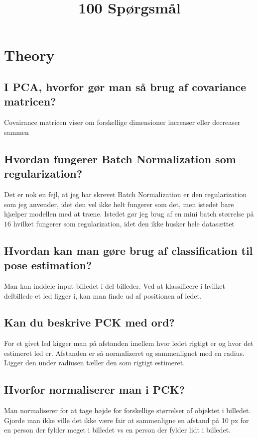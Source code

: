 \documentclass[a4paper]{article}
\begin{document}
\title{100 Spørgsmål}
\author{}
\date{}

\maketitle

\section{Theory}
\subsection{I PCA, hvorfor gør man så brug af covariance matricen?}
Covairance matricen viser om forskellige dimensioner increaser eller decreaser sammen

\subsection{Hvordan fungerer Batch Normalization som regularization?}
Det er nok en fejl, at jeg har skrevet Batch Normalization er den regularization som jeg anvender, idet den vel ikke helt fungerer som det, men istedet bare hjælper modellen med at træne. Istedet gør jeg brug af en mini batch størrelse på $16$ hvilket fungerer som regularization, idet den ikke husker hele datasættet

\subsection{Hvordan kan man gøre brug af classification til pose estimation?}
Man kan inddele input billedet i del billeder. Ved at klassificere i hvilket delbillede et led ligger i, kan man finde ud af positionen af ledet.

\subsection{Kan du beskrive PCK med ord?}
For et givet led kigger man på afstanden imellem hvor ledet rigtigt er og hvor det estimeret led er. Afstanden er så normalizeret og sammenlignet med en radius. Ligger den under radiusen tæller den som rigtigt estimeret.

\subsection{Hvorfor normaliserer man i PCK?}
Man normaliserer for at tage højde for forskellige størrelser af objektet i billedet. Gjorde man ikke ville det ikke være fair at sammenligne en afstand på 10 px for en person der fylder meget i billedet vs en person der fylder lidt i billedet. 
\end{document}
